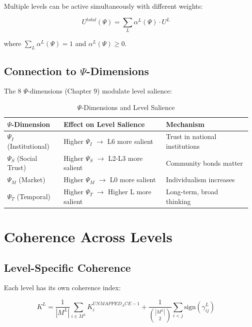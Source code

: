 Multiple levels can be active simultaneously with different weights:

\begin{equation}
U^{total}(\Psi) = \sum_L \alpha^L(\Psi) \cdot U^L
\end{equation}

where $\sum_L \alpha^L(\Psi) = 1$ and $\alpha^L(\Psi) \geq 0$.

\subsection{Connection to $\Psi$-Dimensions}

The 8 $\Psi$-dimensions (Chapter 9) modulate level salience:

\begin{table}[htbp]
\centering
\caption{$\Psi$-Dimensions and Level Salience}
\label{tab:aaa-psi-levels}
\renewcommand{\arraystretch}{1.3}
\begin{tabular}{@{}lll@{}}
\toprule
\textbf{$\Psi$-Dimension} & \textbf{Effect on Level Salience} & \textbf{Mechanism} \\
\midrule
$\Psi_I$ (Institutional) & Higher $\Psi_I$ $\to$ L6 more salient & Trust in national institutions \\
$\Psi_S$ (Social Trust) & Higher $\Psi_S$ $\to$ L2-L3 more salient & Community bonds matter \\
$\Psi_M$ (Market) & Higher $\Psi_M$ $\to$ L0 more salient & Individualism increases \\
$\Psi_T$ (Temporal) & Higher $\Psi_T$ $\to$ Higher L more salient & Long-term, broad thinking \\
\bottomrule
\end{tabular}
\end{table}

\section{Coherence Across Levels}
\label{sec:aaa-coherence}

\subsection{Level-Specific Coherence}

Each level has its own coherence index:

\begin{equation}
K^L = \frac{1}{|M^L|} \sum_{i \in M^L} K^{UNMAPPED_ACE-1}_i + \frac{1}{\binom{|M^L|}{2}} \sum_{i < j} \text{sign}(\gamma^L_{ij})
\end{equation}

